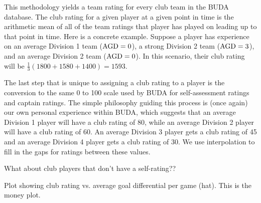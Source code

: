 This methodology yields a team rating for every club team in the BUDA database.  The club rating for a given player at a given point in time is the arithmetic mean of all of the team ratings that player has played on leading up to that point in time.  Here is a concrete example.  Suppose a player has experience on an average Division 1 team (${\rm AGD} = 0$), a strong Division 2 team (${\rm AGD} = 3$), and an average Division 2 team (${\rm AGD} = 0$).  In this scenario, their club rating will be $\frac{1}{3}(1800 + 1580 + 1400) = 1593$.

The last step that is unique to assigning a club rating to a player is the conversion to the same 0 to 100 scale used by BUDA for self-assessment ratings and captain ratings.  The simple philosophy guiding this process is (once again) our own personal experience within BUDA, which suggests that an average Division 1 player will have a club rating of 80, while an average Division 2 player will have a club rating of 60. An average Division 3 player gets a club rating of 45 and an average Division 4 player gets a club rating of 30. We use interpolation to fill in the gaps for ratings between these values.

What about club players that don't have a self-rating??

Plot showing club rating vs. average goal differential per game (hat).  This is the money plot.